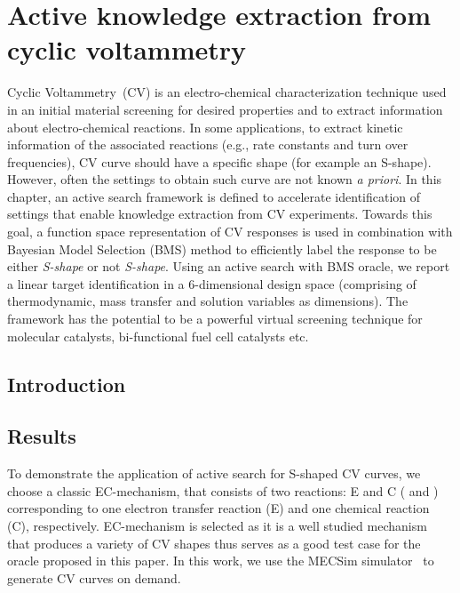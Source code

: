 \chapter{Active knowledge extraction from cyclic voltammetry}\label{chapter3}
Cyclic Voltammetry~(CV) is an electro-chemical characterization technique used in an initial material screening for desired properties and to extract information about electro-chemical reactions.
In some applications, to extract kinetic information of the associated reactions (e.g., rate constants and turn over frequencies), CV curve should have a specific shape (for example an S-shape). 
However, often the settings to obtain such curve are not known \textit{a priori}. 
In this chapter, an active search framework is defined to accelerate identification of settings that enable knowledge extraction from CV experiments.
Towards this goal, a function space representation of CV responses is used in combination with Bayesian Model Selection (BMS) method to efficiently label the response to be either \textit{S-shape} or not \textit{S-shape}. 
Using an active search with BMS oracle, we report a linear target identification in a 6-dimensional design space (comprising of thermodynamic, mass transfer and solution variables as dimensions). 
The framework has the potential to be a powerful virtual screening technique for molecular catalysts, bi-functional fuel cell catalysts etc.


\section{Introduction}





\section{Results}
To demonstrate the application of active search for S-shaped CV curves, we choose a classic EC-mechanism, that consists of two reactions: E and C ( and ) corresponding to one electron transfer reaction (E) and one chemical reaction (C), respectively. 
EC-mechanism is selected as it is a well studied mechanism~\cite{rountree2014evaluation, costentin2015cyclic} that produces a variety of CV shapes thus serves as a good test case for the oracle proposed in this paper. 
In this work, we use the MECSim simulator~\cite{MECSim} to generate CV curves on demand. 

